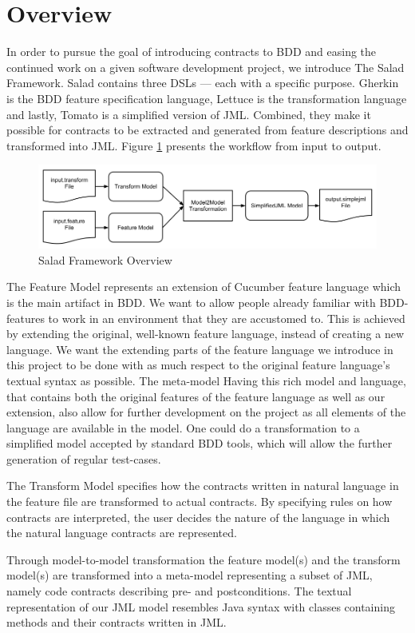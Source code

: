 \section{Overview}

In order to pursue the goal of introducing contracts to BDD and easing the continued work on a given software development project, we introduce The Salad Framework. Salad contains three DSLs --- each with a specific purpose. Gherkin is the BDD feature specification language, Lettuce is the transformation language and lastly, Tomato is a simplified version of JML.  Combined, they make it possible for contracts to be extracted and generated from feature descriptions and transformed into JML. Figure \ref{fig:saladoverview} presents the workflow from input to output.

\begin{figure}
	\begin{center}
		\includegraphics[scale=0.46]{images/framework_overview.png}
	\end{center}
	\caption{Salad Framework Overview}
	\label{fig:saladoverview}
\end{figure}

The Feature Model represents an extension of Cucumber feature language which is the main artifact in BDD.
We want to allow people already familiar with BDD-features to work in an environment that they are accustomed to. 
This is achieved by extending the original, well-known feature language, instead of creating a new language. 
We want the extending parts of the feature language we introduce in this project to be done with as much respect to the original feature language's
textual syntax as possible. The meta-model Having this rich model and language, that contains both the original features of the feature language as 
well as our extension, also allow for further development on the project as all elements of the language are available in the model. 
One could do a transformation to a simplified model accepted by standard BDD tools, which will allow the further generation of regular test-cases.

The Transform Model specifies how the contracts written in natural language in the feature file are transformed to actual contracts.
By specifying rules on how contracts are interpreted, the user decides the nature of the language in which the natural language contracts are represented. 

Through model-to-model transformation the feature model(s) and the transform model(s) are transformed into a meta-model representing a subset of JML,
namely code contracts describing pre- and postconditions. The textual representation of our JML model resembles Java syntax with classes containing methods and
their contracts written in JML.
